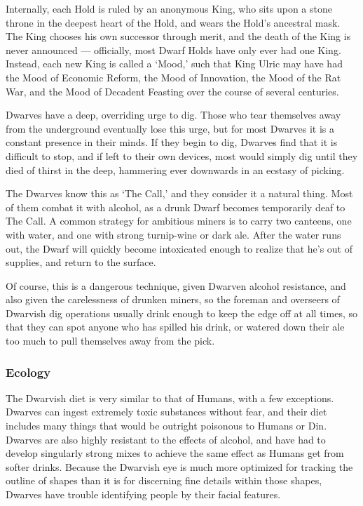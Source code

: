 \documentclass[oneside,11pt,english]{book}
\begin{document}
Internally, each Hold is ruled by an anonymous King, who sits upon a stone throne in the deepest heart of 
the Hold, and wears the Hold's ancestral mask. The King chooses his own successor through merit, and 
the death of the King is never announced — officially, most Dwarf Holds have only ever had one King. 
Instead, each new King is called a ‘Mood,’ such that King Ulric may have had the Mood of Economic 
Reform, the Mood of Innovation, the Mood of the Rat War, and the Mood of Decadent Feasting over the 
course of several centuries. 


Dwarves have a deep, overriding urge to dig. Those who tear themselves away from the underground 
eventually lose this urge, but for most Dwarves it is a constant presence in their minds. If they begin to 
dig, Dwarves find that it is difficult to stop, and if left to their own devices, most would simply dig until 
they died of thirst in the deep, hammering ever downwards in an ecstasy of picking. 


The Dwarves know this as ‘The Call,’ and they consider it a natural thing. Most of them combat it with 
alcohol, as a drunk Dwarf becomes temporarily deaf to The Call. A common strategy for ambitious 
miners is to carry two canteens, one with water, and one with strong turnip-wine or dark ale. After the 
water runs out, the Dwarf will quickly become intoxicated enough to realize that he's out of supplies, and 
return to the surface. 


Of course, this is a dangerous technique, given Dwarven alcohol resistance, and also given the 
carelessness of drunken miners, so the foreman and overseers of Dwarvish dig operations usually drink 
enough to keep the edge off at all times, so that they can spot anyone who has spilled his drink, or 
watered down their ale too much to pull themselves away from the pick. 
\subsubsection*{Ecology} 
The Dwarvish diet is very similar to that of Humans, with a few exceptions. Dwarves can ingest 
extremely toxic substances without fear, and their diet includes many things that would be outright 
poisonous to Humans or Din. Dwarves are also highly resistant to the effects of alcohol, and have had to 
develop singularly strong mixes to achieve the same effect as Humans get from softer drinks. Because the 
Dwarvish eye is much more optimized for tracking the outline of shapes than it is for discerning fine 
details within those shapes, Dwarves have trouble identifying people by their facial features. 
\end{document}
